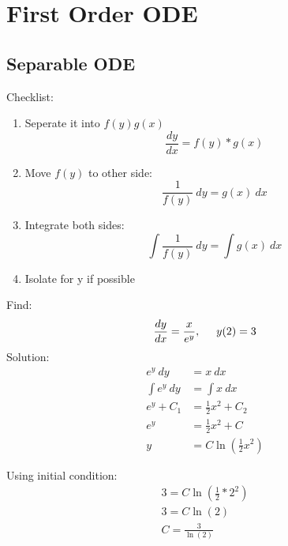 \section{First Order ODE}
	\subsection{Separable ODE}
	Checklist:
	\begin{enumerate}
	\item Seperate it into $f(y)g(x)$
	\begin{equation}
	\frac{dy}{dx}=f(y)*g(x)
	\end{equation}
	
	\item Move $f(y)$ to other side:
	\begin{equation}
	\frac{1}{f(y)}\ dy=g(x)\ dx
	\end{equation}
	
	\item Integrate both sides:
	\begin{equation}
	\int\frac{1}{f(y)}\ dy=\int g(x)\ dx
	\end{equation}
	
	\item Isolate for y if possible
	\end{enumerate}
	
	\begin{simple}{}{}
	Find:
	$$\frac{dy}{dx}=\frac{x}{e^y},\hspace{0.5cm}y(2)=3$$
	\indent Solution:
	\begin{align*}
	e^y\ dy&=x\ dx\\
	\int e^y\ dy&=\int x\ dx\\
	e^y+C_1&=\frac{1}{2}x^2+C_2\\
	e^y&=\frac{1}{2}x^2+C\\
	y&=C\ln{\left(\frac{1}{2}x^2\right)}
	\end{align*}
	
	Using initial condition:
	\begin{align*}
	3=C\ln{\left(\frac{1}{2}*2^2\right)}\\
	3=C\ln{(2)}\\
	C=\frac{3}{\ln(2)}
	\end{align*}
	\end{simple}
	
